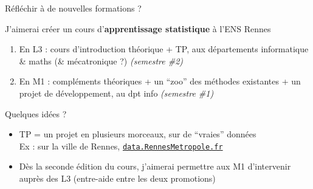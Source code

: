 \documentclass[11pt,english,ignorenonframetext,]{beamer}
\providecommand{\tightlist}{%
  \setlength{\itemsep}{0pt}\setlength{\parskip}{0pt}}
\begin{document}
\begin{frame}{Réfléchir à de nouvelles formations ? \hfill{} }

\pause

J'aimerai créer un cours d'\textcolor{ml}{\textbf{apprentissage statistique}} à l'ENS Rennes

\begin{enumerate}
[1.]
\tightlist
\item
  En L3 : cours d'introduction théorique + TP, aux départements \textcolor{info}{informatique} \& \textcolor{maths}{maths} (\& \textcolor{meca}{mécatronique} ?)
  \hfill{}
  \emph{(semestre \#2)}
\item
  En M1 : compléments théoriques + un ``zoo'' des méthodes existantes + un projet de développement, \textcolor{info}{au dpt info}
  \hfill{}
  \emph{(semestre \#1)}
\end{enumerate}

\pause

\begin{exampleblock}{Quelques idées ?}

\begin{itemize}
\tightlist
\item
  TP = un projet en plusieurs morceaux, sur de ``vraies'' données\\
  Ex : sur la ville de Rennes, \href{https://data.rennesmetropole.fr/}{\texttt{data.RennesMetropole.fr}}
\item
  Dès la seconde édition du cours, j'aimerai permettre aux M1
  d'intervenir auprès des L3
  (entre-aide entre les deux promotions)
\end{itemize}

\end{exampleblock}

\end{frame}
\end{document}
